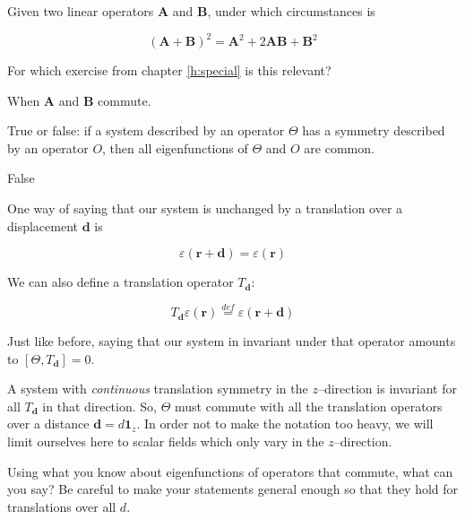 \begin{exer}
Given two linear operators $\mathbf A$ and $\mathbf B$, under which circumstances is

$$\left ( {\mathbf A} + {\mathbf B} \right ) ^2 =  {\mathbf A}^2 + 2 {\mathbf A}{\mathbf B}  + {\mathbf B}^2$$

For which exercise from chapter \ref{h:special} is this relevant?
\begin{sol}
When $\mathbf A$ and $\mathbf B$ commute.
\end{sol}
\end{exer}

\begin{exer}
True or false: if a system described by an operator $\Theta$ has a symmetry described by an operator $O$, then all eigenfunctions of $\Theta$ and $O$ are common.
  \begin{sol}
    False
\end{sol}  
\end{exer}

\pagebreak


One way of saying that our system is unchanged by a translation over a displacement ${\mathbf d}$ is

\begin{equation}
\varepsilon ({\mathbf r} + {\mathbf d}) =  \varepsilon ({\mathbf r})
\end{equation} 

We can also define a translation operator $T_{\mathbf d}$:

\begin{equation}
T_{\mathbf d} \varepsilon ({\mathbf r}) \stackrel{def}{=} \varepsilon ({\mathbf r} + {\mathbf d})
\end{equation} 

Just like before, saying that our system in invariant under that operator amounts to $[\Theta, T_{\mathbf d}] = 0$.

A system with \emph{continuous} translation symmetry in the $z$--direction is invariant for all $T_{\mathbf d}$ in that direction. So, $\Theta$ must commute with all the translation operators over a distance ${\mathbf d} = d {\mathbf 1}_z$. In order not to make the notation too heavy, we will limit ourselves here to scalar fields which only vary in the $z$--direction.

\begin{cue}
  Using what you know about eigenfunctions of operators that commute, what can you say? Be careful to make your statements general enough so that they hold for translations over all ${d}$.
\end{cue}

